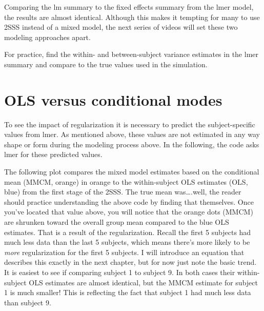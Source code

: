 \documentclass[
]{book}
\newenvironment{Shaded}{\begin{snugshade}}{\end{snugshade}}
\newcommand{\CommentTok}[1]{\textcolor[rgb]{0.56,0.35,0.01}{\textit{#1}}}
\newcommand{\DecValTok}[1]{\textcolor[rgb]{0.00,0.00,0.81}{#1}}
\newcommand{\KeywordTok}[1]{\textcolor[rgb]{0.13,0.29,0.53}{\textbf{#1}}}
\newcommand{\NormalTok}[1]{#1}
\newcommand{\OperatorTok}[1]{\textcolor[rgb]{0.81,0.36,0.00}{\textbf{#1}}}
\newcommand{\StringTok}[1]{\textcolor[rgb]{0.31,0.60,0.02}{#1}}
\begin{document}
Comparing the lm summary to the fixed effects summary from the lmer model, the results are almost identical. Although this makes it tempting for many to use 2SSS instead of a mixed model, the next series of videos will set these two modeling approaches apart.

For practice, find the within- and between-subject variance estimates in the lmer summary and compare to the true values used in the simulation.

\hypertarget{ols-versus-conditional-modes}{%
\section{OLS versus conditional modes}\label{ols-versus-conditional-modes}}

To see the impact of regularization it is necessary to predict the subject-specific values from lmer. As mentioned above, these values are not estimated in any way shape or form during the modeling process above. In the following, the code asks lmer for these predicted values.

\begin{Shaded}
\end{Shaded}

The following plot compares the mixed model estimates based on the conditional mean (MMCM, orange) in orange to the within-subject OLS estimates (OLS, blue) from the first stage of the 2SSS. The true mean was\ldots.well, the reader should practice understanding the above code by finding that themselves. Once you've located that value above, you will notice that the orange dots (MMCM) are shrunken toward the overall group mean compared to the blue OLS estimates. That is a result of the regularization. Recall the first 5 subjects had much less data than the last 5 subjects, which means there's more likely to be \emph{more} regularization for the first 5 subjects. I will introduce an equation that describes this exactly in the next chapter, but for now just note the basic trend. It is easiest to see if comparing subject 1 to subject 9. In both cases their within-subject OLS estimates are almost identical, but the MMCM estimate for subject 1 is much smaller! This is reflecting the fact that subject 1 had much less data than subject 9.
\end{document}
